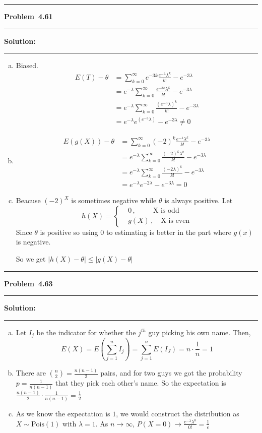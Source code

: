 \documentclass[10.5pt]{article}
\newcommand\question[1]{\vspace{.2in}\hrule\vspace{0.04in}\textbf{Problem\ #1}\vspace{.4em}\hrule\vspace{.10in}}
\newcommand\Solution{\vspace{.3in}\textbf{Solution:}\vspace{.5em}\hrule\vspace{.08in}\par}
\begin{document}
\question{4.61}
\Solution{}
\begin{enumerate}[(a)]
	\item Biased.
	\begin{align*}
		E(T) - \theta
		&=\sum_{k = 0}^{\infty} e^{-3k}\frac{e^{-\lambda}\lambda^k}{k!} - e^{-3\lambda}\\[6pt]
		&=e^{-\lambda}\sum_{k = 0}^{\infty} \frac{e^{-3k}\lambda^k}{k!}- e^{-3\lambda}\\[6pt]
		&=e^{-\lambda}\sum_{k = 0}^{\infty} \frac{(e^{-3}\lambda)^k}{k!}- e^{-3\lambda}\\[6pt]
		&=e^{-\lambda}e^{(e^{-3}\lambda)}-e^{-3\lambda}\neq0
	\end{align*}
	\vspace{1cm}
	\item \begin{align*}
		E(g(X)) - \theta
		&=\sum_{k = 0}^{\infty} (-2)^k\frac{e^{-\lambda}\lambda^k}{k!} - e^{-3\lambda}\\[6pt]
		&=e^{-\lambda}\sum_{k = 0}^{\infty} \frac{(-2)^k\lambda^k}{k!}- e^{-3\lambda}\\[6pt]
		&=e^{-\lambda}\sum_{k = 0}^{\infty} \frac{(-2\lambda)^k}{k!}- e^{-3\lambda}\\[6pt]
		&=e^{-\lambda}e^{-2\lambda}-e^{-3\lambda}=0
	\end{align*}
	\vspace{1cm}
	\item Beacuse $(-2)^X$ is sometimes negative while $\theta$ is always positive. Let
	\begin{equation*}
		h(X) = 
		\begin{cases}
			& 0\, ,\quad\ \ \quad\text{X is odd}\\
			& g(X)\, ,\quad\text{X is even}
		\end{cases}
	\end{equation*}
	Since $\theta$ is positive so using $0$ to estimating is better in the part where $g(x)$ is negative.

	So we get $|h(X)-\theta|\leqslant|g(X)-\theta|$
\end{enumerate}



\pagebreak

\question{4.63}
\Solution{}
\begin{enumerate}[(a)]
	\item Let $I_j$ be the indicator for whether the $j^{th}$ guy picking his own name. Then, 
	$$E(X) = E\left(\sum_{j = 1}^n I_j\right) = \sum_{j = 1}^nE(I_J) = n\cdot\frac{1}{n} = 1$$\vspace{1cm}
	\item There are $\binom{n}{2} = \frac{n(n-1)}{2}$ pairs, and for two guys we got the probability $p = \frac{1}{n(n-1)}$ that
	they pick each other's name. So the expectation is $\frac{n(n-1)}{2}\cdot\frac{1}{n(n-1)} = \frac{1}{2}$\vspace{1cm}
	\item As we know the expectation is $1$, we would construct the distribution as $X\sim\text{Pois}(1)$ with $\lambda = 1$. As $n\to\infty$, 
	$P(X = 0)\to \frac{e^{-\lambda}\lambda^0}{0!} = \frac{1}{e}$\vspace{1cm}
\end{enumerate}
\end{document}
